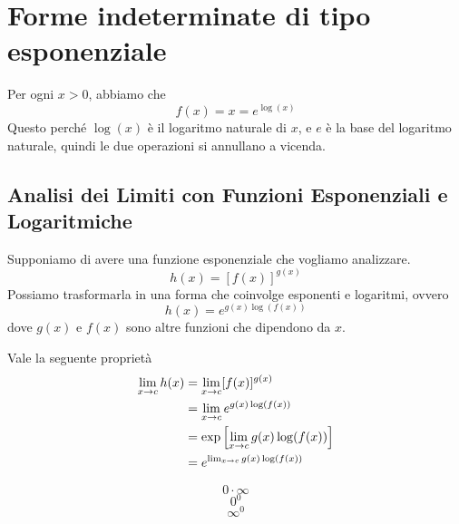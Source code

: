 \documentclass{book}
\begin{document}
\section{Forme indeterminate di tipo esponenziale}

\begin{proposition}
    Per ogni $x > 0$, abbiamo che
    \[
        f(x) = x = e^{\log(x)}
    \]
    Questo perché $\log(x)$ è il logaritmo naturale di $x$, e $e$ è la base del logaritmo naturale, quindi le due operazioni si annullano a vicenda.
\end{proposition}
\subsection{Analisi dei Limiti con Funzioni Esponenziali e Logaritmiche}
\noindent\begin{minipage}{\textwidth}
    \begin{proposition}
        Supponiamo di avere una funzione esponenziale che vogliamo analizzare.
        \[
            \displaystyle h(x) = [f(x)]^{g(x)}
        \]
        Possiamo trasformarla in una forma che coinvolge esponenti e logaritmi, ovvero
        \[
            \displaystyle h(x) = e^{g(x) \log(f(x))}
        \]
        dove $g(x)$ e $f(x)$ sono altre funzioni che dipendono da $x$.
    \end{proposition}
\end{minipage}

\begin{proposition}
    Vale la seguente proprietà
    \begin{align*}
        \renewcommand{\arraystretch}{2}
        \displaystyle \lim_{x \to c} h(x) & = \lim_{x \to c} [f(x)]^{g(x)}                      \\
        \displaystyle                     & = \lim_{x \to c} e^{g(x) \log(f(x))}                \\
        \displaystyle                     & = \exp\left[{\lim_{x \to c} g(x) \log(f(x))}\right] \\
        \displaystyle                     & = e^{\lim_{x \to c} g(x) \log(f(x))}                \\
    \end{align*}
\end{proposition}
\begin{proposition}
    \[
        0 \cdot \infty
    \]
    \[
        0^0
    \]
    \[
        \infty^0
    \]
\end{proposition}
\end{document}
